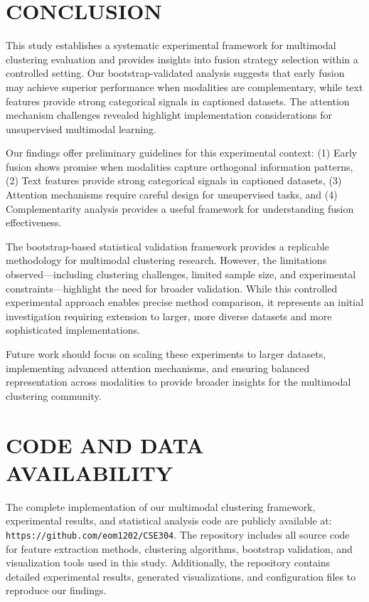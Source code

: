 \documentclass[sigconf]{acmart}
\begin{document}
\section{CONCLUSION}

This study establishes a systematic experimental framework for multimodal clustering evaluation and provides insights into fusion strategy selection within a controlled setting. Our bootstrap-validated analysis suggests that early fusion may achieve superior performance when modalities are complementary, while text features provide strong categorical signals in captioned datasets. The attention mechanism challenges revealed highlight implementation considerations for unsupervised multimodal learning.

Our findings offer preliminary guidelines for this experimental context: (1) Early fusion shows promise when modalities capture orthogonal information patterns, (2) Text features provide strong categorical signals in captioned datasets, (3) Attention mechanisms require careful design for unsupervised tasks, and (4) Complementarity analysis provides a useful framework for understanding fusion effectiveness.

The bootstrap-based statistical validation framework provides a replicable methodology for multimodal clustering research. However, the limitations observed—including clustering challenges, limited sample size, and experimental constraints—highlight the need for broader validation. While this controlled experimental approach enables precise method comparison, it represents an initial investigation requiring extension to larger, more diverse datasets and more sophisticated implementations.

Future work should focus on scaling these experiments to larger datasets, implementing advanced attention mechanisms, and ensuring balanced representation across modalities to provide broader insights for the multimodal clustering community.

\section{CODE AND DATA AVAILABILITY}

The complete implementation of our multimodal clustering framework, experimental results, and statistical analysis code are publicly available at: \texttt{https://github.com/eom1202/CSE304}. The repository includes all source code for feature extraction methods, clustering algorithms, bootstrap validation, and visualization tools used in this study. Additionally, the repository contains detailed experimental results, generated visualizations, and configuration files to reproduce our findings.



\end{document}
